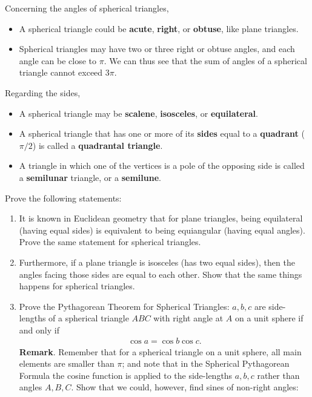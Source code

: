 \begin{tcolorbox}[title={Classification of Spherical Triangles}]
    \begin{definition} 
    Concerning the angles of spherical triangles,
    \begin{itemize}
        \item  A spherical triangle could be \textbf{acute}, \textbf{right}, or \textbf{obtuse}, like plane triangles.
        \item Spherical triangles may have two or three right or obtuse angles, and each angle can be close to $\pi$. We can thus see that the sum of angles of a spherical triangle cannot exceed $3\pi$.
    \end{itemize}
    Regarding the sides,
    \begin{itemize}
        \item A spherical triangle may be \textbf{scalene}, \textbf{isosceles}, or \textbf{equilateral}.
        \item A spherical triangle that has one or more of its \textbf{sides} equal to a \textbf{quadrant} ($\pi/2$) is called a \textbf{quadrantal triangle}.
        \item A triangle in which one of the vertices is a pole of the opposing side is called a \textbf{semilunar} triangle, or a \textbf{semilune}.
    \end{itemize}
    \end{definition}
    \begin{question} 
    Prove the following statements:
    \begin{enumerate}
        \item It is known in Euclidean geometry that for plane triangles, being equilateral (having equal sides) is equivalent to being equiangular (having equal angles). Prove the same statement for spherical triangles. 
        \item Furthermore, if a plane triangle is isosceles (has two equal sides), then the angles facing those sides are equal to each other. Show that the same things happens for spherical triangles.
        \item Prove the Pythagorean Theorem for Spherical Triangles: $a,b,c$ are side-lengths of a spherical triangle $ABC$ with right angle at $A$ on a unit sphere if and only if
        \vspace{-0.5em}
        \begin{align*}
            \cos a = \cos b \cos c.
        \end{align*}
        \noindent \textbf{Remark}. Remember that for a spherical triangle on a unit sphere, all main elements are smaller than $\pi$; and note that in the Spherical Pythagorean Formula the cosine function is applied to the side-lengths $a,b,c$ rather than angles $A,B,C$. Show that we could, however, find sines of non-right angles:

\end{enumerate}
\end{question}
\end{tcolorbox}
